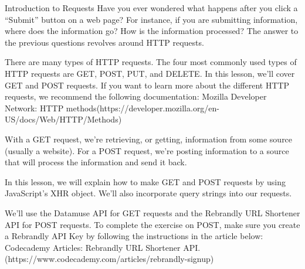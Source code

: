 Introduction to Requests
    Have you ever wondered what happens after you click a “Submit” button on a web page? For instance, if you are submitting information, where does the information go? How is the information processed? The answer to the previous questions revolves around HTTP requests.
    
    There are many types of HTTP requests. The four most commonly used types of HTTP requests are GET, POST, PUT, and DELETE. In this lesson, we’ll cover GET and POST requests. If you want to learn more about the different HTTP requests, we recommend the following documentation:
        Mozilla Developer Network: HTTP methods(https://developer.mozilla.org/en-US/docs/Web/HTTP/Methods)

    With a GET request, we’re retrieving, or getting, information from some source (usually a website). For a POST request, we’re posting information to a source that will process the information and send it back.

    In this lesson, we will explain how to make GET and POST requests by using JavaScript’s XHR object. We’ll also incorporate query strings into our requests.

    We’ll use the Datamuse API for GET requests and the Rebrandly URL Shortener API for POST requests. To complete the exercise on POST, make sure you create a Rebrandly API Key by following the instructions in the article below:
        Codecademy Articles: Rebrandly URL Shortener API.(https://www.codecademy.com/articles/rebrandly-signup)